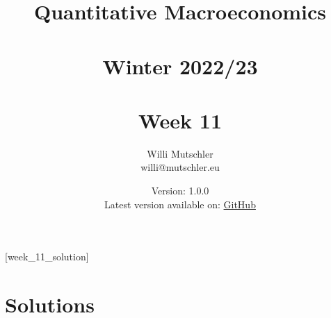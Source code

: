 
\newif\ifDisplaySolutions\DisplaySolutionstrue


\title{Quantitative Macroeconomics\\~\\Winter 2022/23\\~\\Week 11}
\author{Willi Mutschler\\willi@mutschler.eu}
\date{Version: 1.0.0\\Latest version available on: \href{https://github.com/wmutschl/Quantitative-Macroeconomics/releases/latest/download/week_11.pdf}{GitHub}}
\maketitle\thispagestyle{empty}

\newpage
{}[week_11_solution]
\tableofcontents\thispagestyle{empty}\newpage

\setcounter{page}{1}
\newpage
\newpage
\newpage
\printbibliography
\newpage

\ifDisplaySolutions
\newpage
\appendix
\section{Solutions}

\fi
